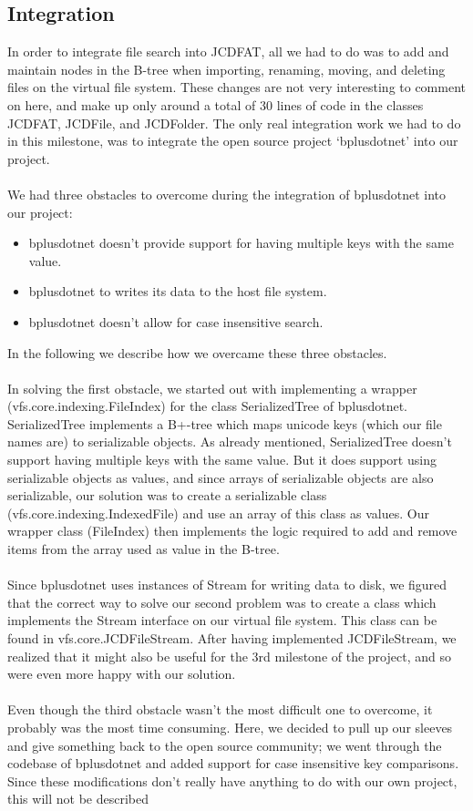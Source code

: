 \documentclass[a4paper,12pt]{article}
\begin{document}
\subsection{Integration}
\label{sec:integration}
In order to integrate file search into JCDFAT, all we had to do was to add and maintain nodes in the B-tree when importing, renaming, moving, and deleting files on the virtual file system. These changes are not very interesting to comment on here, and make up only around a total of 30 lines of code in the classes JCDFAT, JCDFile, and JCDFolder. The only real integration work we had to do in this milestone, was to integrate the open source project `bplusdotnet' into our project.\\
\\
We had three obstacles to overcome during the integration of bplusdotnet into our project:
\begin{itemize}
    \item bplusdotnet doesn't provide support for having multiple keys with the same value.
    \item bplusdotnet to writes its data to the host file system.
    \item bplusdotnet doesn't allow for case insensitive search.
\end{itemize}
In the following we describe how we overcame these three obstacles.\\
\\
In solving the first obstacle, we started out with implementing a wrapper (vfs.core.indexing.FileIndex) for the class SerializedTree of bplusdotnet. SerializedTree implements a B+-tree which maps unicode keys (which our file names are) to serializable objects. As already mentioned, SerializedTree doesn't support having multiple keys with the same value. But it does support using serializable objects as values, and since arrays of serializable objects are also serializable, our solution was to create a serializable class (vfs.core.indexing.IndexedFile) and use an array of this class as values. Our wrapper class (FileIndex) then implements the logic required to add and remove items from the array used as value in the B-tree.\\
\\
Since bplusdotnet uses instances of Stream for writing data to disk, we figured that the correct way to solve our second problem was to create a class which implements the Stream interface on our virtual file system. This class can be found in vfs.core.JCDFileStream. After having implemented JCDFileStream, we realized that it might also be useful for the 3rd milestone of the project, and so were even more happy with our solution.\\
\\
Even though the third obstacle wasn't the most difficult one to overcome, it probably was the most time consuming. Here, we decided to pull up our sleeves and give something back to the open source community; we went through the codebase of bplusdotnet and added support for case insensitive key comparisons. Since these modifications don't really have anything to do with our own project, this will not be described
\end{document}
